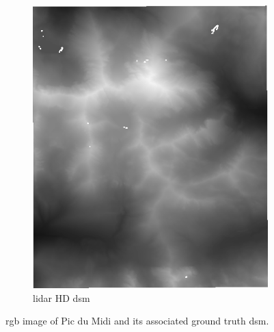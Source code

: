 \begin{figure}
\begin{subfigure}[t]{0.48\linewidth}
        \includegraphics[width=\linewidth]{Images/Chap_6/miniature_Pic_du_midi_gt.png}
        \caption{\acrshort{lidar} HD \acrshort{dsm}}
        \label{fig:miniature_pic_du_midi_gt}
    \end{subfigure}
    \caption{\acrshort{rgb} image of Pic du Midi and its associated ground truth \acrshort{dsm}.}
    \label{fig:miniature_pic_du_midi}
\end{figure}

